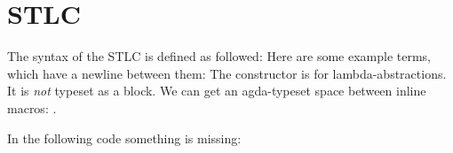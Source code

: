\documentclass{article}
\begin{document}
  \section{STLC}
  The syntax of the STLC is defined as followed:
  \STLCSyntax
  Here are some example terms, which have a newline between them:
  \STLCExamples
  The constructor \STLCEAbs{} is for lambda-abstractions. It is \emph{not}
  typeset as a block. We can get an agda-typeset space between inline macros:
  \mbox{\STLCEAbs*\STLCEAbs}.

  In the following code something is missing:
  \STLCHideExample
\end{document}

